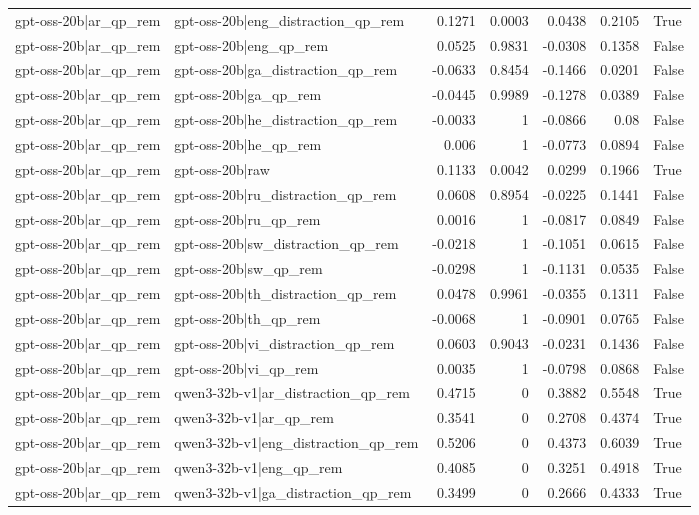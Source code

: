 \begin{table}
\begin{tabular}{l l r r r r l}
gpt-oss-20b|ar_qp_rem & gpt-oss-20b|eng_distraction_qp_rem & 0.1271 & 0.0003 & 0.0438 & 0.2105 & True \\
gpt-oss-20b|ar_qp_rem & gpt-oss-20b|eng_qp_rem & 0.0525 & 0.9831 & -0.0308 & 0.1358 & False \\
gpt-oss-20b|ar_qp_rem & gpt-oss-20b|ga_distraction_qp_rem & -0.0633 & 0.8454 & -0.1466 & 0.0201 & False \\
gpt-oss-20b|ar_qp_rem & gpt-oss-20b|ga_qp_rem & -0.0445 & 0.9989 & -0.1278 & 0.0389 & False \\
gpt-oss-20b|ar_qp_rem & gpt-oss-20b|he_distraction_qp_rem & -0.0033 & 1 & -0.0866 & 0.08 & False \\
gpt-oss-20b|ar_qp_rem & gpt-oss-20b|he_qp_rem & 0.006 & 1 & -0.0773 & 0.0894 & False \\
gpt-oss-20b|ar_qp_rem & gpt-oss-20b|raw & 0.1133 & 0.0042 & 0.0299 & 0.1966 & True \\
gpt-oss-20b|ar_qp_rem & gpt-oss-20b|ru_distraction_qp_rem & 0.0608 & 0.8954 & -0.0225 & 0.1441 & False \\
gpt-oss-20b|ar_qp_rem & gpt-oss-20b|ru_qp_rem & 0.0016 & 1 & -0.0817 & 0.0849 & False \\
gpt-oss-20b|ar_qp_rem & gpt-oss-20b|sw_distraction_qp_rem & -0.0218 & 1 & -0.1051 & 0.0615 & False \\
gpt-oss-20b|ar_qp_rem & gpt-oss-20b|sw_qp_rem & -0.0298 & 1 & -0.1131 & 0.0535 & False \\
gpt-oss-20b|ar_qp_rem & gpt-oss-20b|th_distraction_qp_rem & 0.0478 & 0.9961 & -0.0355 & 0.1311 & False \\
gpt-oss-20b|ar_qp_rem & gpt-oss-20b|th_qp_rem & -0.0068 & 1 & -0.0901 & 0.0765 & False \\
gpt-oss-20b|ar_qp_rem & gpt-oss-20b|vi_distraction_qp_rem & 0.0603 & 0.9043 & -0.0231 & 0.1436 & False \\
gpt-oss-20b|ar_qp_rem & gpt-oss-20b|vi_qp_rem & 0.0035 & 1 & -0.0798 & 0.0868 & False \\
gpt-oss-20b|ar_qp_rem & qwen3-32b-v1|ar_distraction_qp_rem & 0.4715 & 0 & 0.3882 & 0.5548 & True \\
gpt-oss-20b|ar_qp_rem & qwen3-32b-v1|ar_qp_rem & 0.3541 & 0 & 0.2708 & 0.4374 & True \\
gpt-oss-20b|ar_qp_rem & qwen3-32b-v1|eng_distraction_qp_rem & 0.5206 & 0 & 0.4373 & 0.6039 & True \\
gpt-oss-20b|ar_qp_rem & qwen3-32b-v1|eng_qp_rem & 0.4085 & 0 & 0.3251 & 0.4918 & True \\
gpt-oss-20b|ar_qp_rem & qwen3-32b-v1|ga_distraction_qp_rem & 0.3499 & 0 & 0.2666 & 0.4333 & True \\

\end{tabular}
\end{table}

